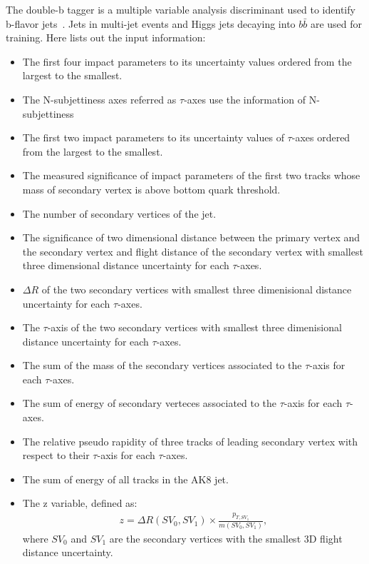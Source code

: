 The double-b tagger is a multiple variable analysis discriminant used to identify b-flavor jets~\citep{CMS-PAS-BTV-15-002}. Jets in multi-jet events and Higgs jets decaying into $b\bar{b}$ are used for training. Here lists out the input information:
\begin{itemize}
\item The first four impact parameters to its uncertainty values ordered from the largest to the smallest.
\item The  N-subjettiness axes referred as $\tau $-axes use the information of N-subjettiness
\item The first two impact parameters to its uncertainty values of $\tau $-axes ordered from the largest to the smallest.
\item The measured significance of impact parameters of the first two tracks whose mass of secondary vertex is above bottom quark threshold.
\item The number of secondary vertices of the jet.
\item The significance of two dimensional distance between the primary vertex and the secondary vertex and flight distance of the secondary vertex with smallest three dimensional distance uncertainty for each $\tau $-axes.
\item $\Delta R$ of the two secondary vertices with smallest three dimenisional distance uncertainty for each $\tau $-axes.
\item The $\tau $-axis of the two secondary vertices with smallest three dimenisional distance uncertainty for each $\tau $-axes.
\item The sum of the mass of the secondary vertices associated to the $\tau $-axis for each $\tau $-axes.
\item The sum of energy of secondary verteces associated to the $\tau $-axis for each $\tau $-axes.
\item The relative pseudo rapidity of three tracks of leading secondary vertex with respect to their $\tau $-axis for each $\tau $-axes.
\item The sum of energy of all tracks in the AK8 jet.
\item The z variable, defined as: 
\begin{equation} \label{eq7}
\begin{split}
z = \Delta R (SV_0, SV_1) \times \frac{p_{T,SV_1}}{m(SV_0,SV_1)}, 
\end{split}
\end{equation}
where $SV_0$ and $SV_1$ are the secondary vertices with the smallest 3D flight distance uncertainty.
\end{itemize} 
